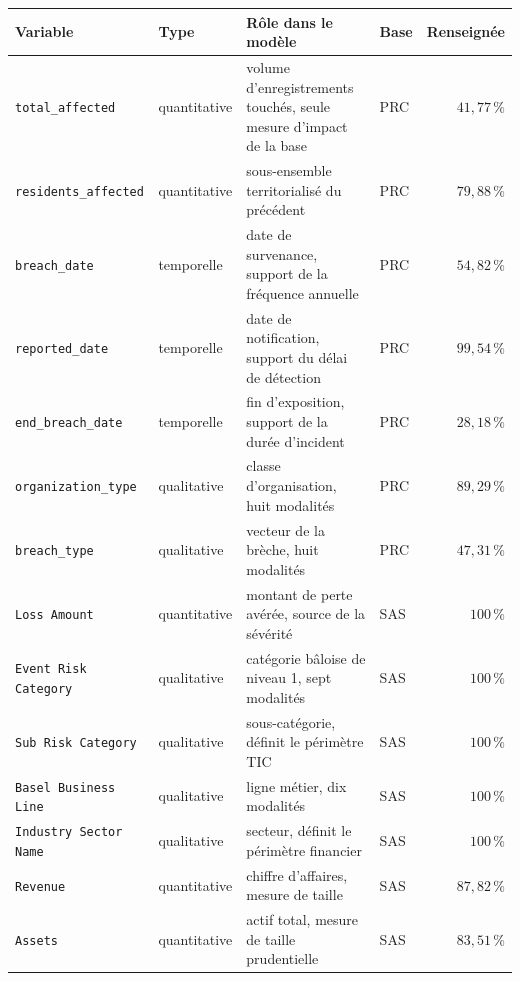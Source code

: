 \begin{center}\small
\renewcommand{\arraystretch}{1.15}
\begin{tabular}{@{}l l p{4.6cm} l r@{}}
\toprule
\textbf{Variable} & \textbf{Type} & \textbf{Rôle dans le modèle} & \textbf{Base} &
\textbf{Renseignée} \\
\midrule
\texttt{total\_affected}      & quantitative & volume d'enregistrements touchés, seule mesure
                                               d'impact de la base & PRC & $41{,}77\,\%$ \\
\texttt{residents\_affected}  & quantitative & sous-ensemble territorialisé du précédent
                                             & PRC & $79{,}88\,\%$ \\
\texttt{breach\_date}         & temporelle   & date de survenance, support de la fréquence annuelle
                                             & PRC & $54{,}82\,\%$ \\
\texttt{reported\_date}       & temporelle   & date de notification, support du délai de détection
                                             & PRC & $99{,}54\,\%$ \\
\texttt{end\_breach\_date}    & temporelle   & fin d'exposition, support de la durée d'incident
                                             & PRC & $28{,}18\,\%$ \\
\texttt{organization\_type}   & qualitative  & classe d'organisation, huit modalités
                                             & PRC & $89{,}29\,\%$ \\
\texttt{breach\_type}         & qualitative  & vecteur de la brèche, huit modalités
                                             & PRC & $47{,}31\,\%$ \\
\midrule
\texttt{Loss Amount}          & quantitative & montant de perte avérée, source de la sévérité
                                             & SAS & $100\,\%$ \\
\texttt{Event Risk Category}  & qualitative  & catégorie bâloise de niveau 1, sept modalités
                                             & SAS & $100\,\%$ \\
\texttt{Sub Risk Category}    & qualitative  & sous-catégorie, définit le périmètre TIC
                                             & SAS & $100\,\%$ \\
\texttt{Basel Business Line}  & qualitative  & ligne métier, dix modalités
                                             & SAS & $100\,\%$ \\
\texttt{Industry Sector Name} & qualitative  & secteur, définit le périmètre financier
                                             & SAS & $100\,\%$ \\
\texttt{Revenue}              & quantitative & chiffre d'affaires, mesure de taille
                                             & SAS & $87{,}82\,\%$ \\
\texttt{Assets}               & quantitative & actif total, mesure de taille prudentielle
                                             & SAS & $83{,}51\,\%$ \\
\bottomrule
\end{tabular}
\end{center}

